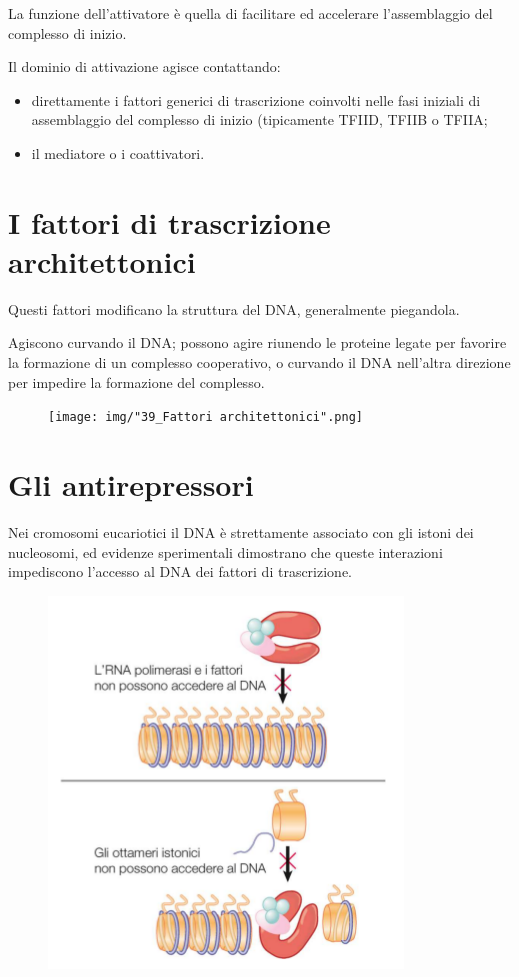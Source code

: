 \documentclass[11pt]{book}
\begin{document}
La funzione dell'attivatore è quella di facilitare ed accelerare
l'assemblaggio del complesso di inizio.

Il dominio di attivazione agisce contattando:

\begin{itemize}
\itemsep1pt\parskip0pt
\item
  direttamente i fattori generici di trascrizione coinvolti nelle fasi
  iniziali di assemblaggio del complesso di inizio (tipicamente TFIID,
  TFIIB o TFIIA;
\item
  il mediatore o i coattivatori.
\end{itemize}

\section{I fattori di trascrizione
architettonici}\label{i-fattori-di-trascrizione-architettonici}

Questi fattori modificano la struttura del DNA, generalmente piegandola.

Agiscono curvando il DNA; possono agire riunendo le proteine legate per
favorire la formazione di un complesso cooperativo, o curvando il DNA
nell'altra direzione per impedire la formazione del complesso.

\begin{figure}[htp]
\centering
\texttt{[image: img/"39\_Fattori architettonici".png]}
\caption{}
\label{fattori-architettonici}
\end{figure}

\section{Gli antirepressori}\label{gli-antirepressori}

Nei cromosomi eucariotici il DNA è strettamente associato con gli istoni
dei nucleosomi, ed evidenze sperimentali dimostrano che queste
interazioni impediscono l'accesso al DNA dei fattori di trascrizione.

\begin{figure}[htp]
\centering
\includegraphics[scale=1.00]{img/40_Antirepressori.png}
\caption{}
\label{antirepressori}
\end{figure}
\end{document}
